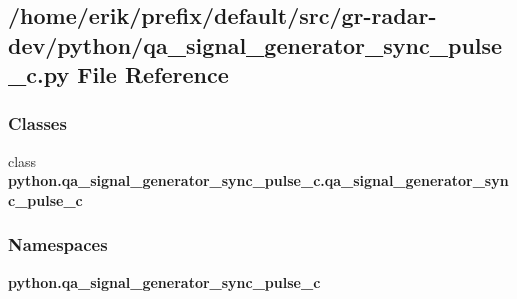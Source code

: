 \subsection{/home/erik/prefix/default/src/gr-\/radar-\/dev/python/qa\+\_\+signal\+\_\+generator\+\_\+sync\+\_\+pulse\+\_\+c.py File Reference}
\label{qa__signal__generator__sync__pulse__c_8py}
\subsubsection*{Classes}
\begin{DoxyCompactItemize}
\item 
class {\bf python.\+qa\+\_\+signal\+\_\+generator\+\_\+sync\+\_\+pulse\+\_\+c.\+qa\+\_\+signal\+\_\+generator\+\_\+sync\+\_\+pulse\+\_\+c}
\end{DoxyCompactItemize}
\subsubsection*{Namespaces}
\begin{DoxyCompactItemize}
\item 
 {\bf python.\+qa\+\_\+signal\+\_\+generator\+\_\+sync\+\_\+pulse\+\_\+c}
\end{DoxyCompactItemize}
